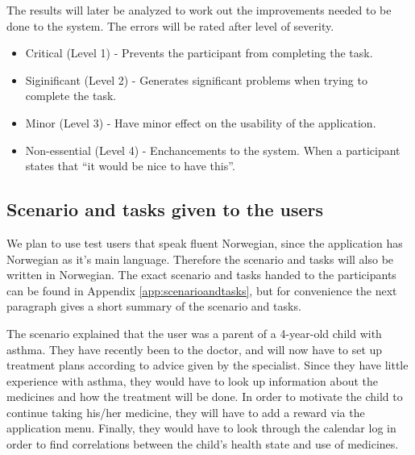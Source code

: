 The results will later be analyzed to work out the improvements needed to be done to the system. The errors will be rated after level of severity\cite{dumas1995practical}. 

\begin{itemize}
\item{Critical (Level 1) - Prevents the participant from completing the task.}
\item{Siginificant (Level 2) - Generates significant problems when trying to complete the task.}
\item{Minor (Level 3) - Have minor effect on the usability of the application.}
\item{Non-essential (Level 4) - Enchancements to the system. When a participant states that ``it would be nice to have this''.}
\end{itemize}



\subsection{Scenario and tasks given to the users}
We plan to use test users that speak fluent Norwegian, since the application has Norwegian as it's main language. Therefore the scenario and tasks will also be written in Norwegian. The exact scenario and tasks handed to the participants can be found in Appendix \ref{app:scenarioandtasks}, but for convenience the next paragraph gives a short summary of the scenario and tasks.

The scenario explained that the user was a parent of a 4-year-old child with asthma. They have recently been to the doctor, and will now have to set up treatment plans according to advice given by the specialist. Since they have little experience with asthma, they would have to look up information about the medicines and how the treatment will be done. In order to motivate the child to continue taking his/her medicine, they will have to add a reward via the application menu. Finally, they would have to look through the calendar log in order to find correlations between the child's health state and use of medicines. 